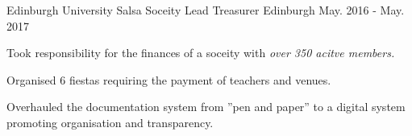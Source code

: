 

\begin{cventries}

  \cventry
    {Edinburgh University Salsa Soceity} %
    {Lead Treasurer} %
    {Edinburgh} %
    {May. 2016 - May. 2017} %
    {
      \begin{cvitems} %
        \item {Took responsibility for the finances of a soceity with \textit{over 350 acitve members.}}
        \item {Organised 6 fiestas requiring the payment of teachers and venues.}
        \item {Overhauled the documentation system from ”pen and paper” to a digital system promoting organisation and transparency.}
      \end{cvitems}
    }
\end{cventries}

